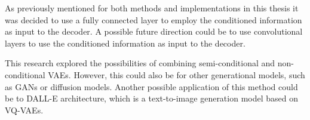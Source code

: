 As previously mentioned for both methods and implementations in this thesis it was decided to use a fully connected layer to employ the conditioned information as input to the decoder. A possible future direction could be to use convolutional layers to use the conditioned information as input to the decoder.

This research explored the possibilities of combining semi-conditional and non-conditional VAEs. However, this could also be for other generational models, such as GANs or diffusion models. Another possible application of this method could be to DALL-E architecture, which is a text-to-image generation model based on VQ-VAEs.
